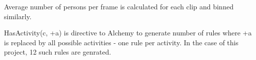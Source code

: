 Average number of persons per frame is calculated for each clip and
binned similarly.

HasActivity(c, +a) is directive to Alchemy to generate number of rules where +a is replaced
by all possible activities - one rule per activity. In the case of this project, 12 such rules are genrated.



\begin{comment}
\section{Example MLN}
\begin{tikzpicture}
	[every node/.style={oval}]
	\node (n1) at (5,10) {Friends(A,B)};
	\node (n6) at (1,10) {6};


\end{tikzpicture}
\end{comment}
